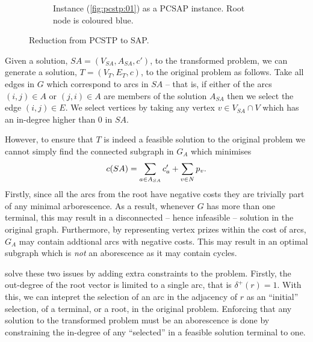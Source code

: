 \begin{figure}[h]
\begin{subfigure}[t]{0.47\linewidth}
    \caption{Instance (\ref{fig:pcstp:01}) as a PCSAP instance. Root node is coloured blue.}
  \end{subfigure}
  \caption{Reduction from PCSTP to SAP.}
  \label{fig:pcstptosap}
\end{figure}

Given a solution, $SA = (V_{SA}, A_{SA}, c')$,
to the transformed problem, we can generate a solution, $T = (V_T, E_T, c)$, to the
original problem as follows.
Take all edges in $G$ which correspond to arcs in $SA$ -- that is, if either of the arcs
$(i, j) \in A$ or $(j, i) \in A$ are members of the solution $A_{SA}$ then we select the edge $(i,j) \in E$.
We select vertices by taking any vertex $v \in V_{SA} \cap V$ which has an in-degree higher than 0 in
$SA$.

However, to ensure that $T$ is indeed a feasible solution to the original problem we
cannot simply find the connected subgraph in $G_A$ which minimises
$$c(SA) = \sum_{a \in A_{SA}} c'_{a} + \sum_{v \in N} p_v\mathnormal{.}$$
Firstly, since all the arcs from the root have negative costs they are trivially part of any minimal arborescence.
As a result, whenever $G$ has more than one terminal, this may result in a disconnected -- hence infeasible --
solution in the original graph.
Furthermore, by representing vertex prizes within the cost of arcs,
 $G_A$  may contain addtional arcs with negative costs. This may result in an
optimal subgraph which is \textit{not} an aborescence as it may contain cycles.

\citet{ljubic2005solving} solve these two issues by adding extra constraints to the problem. Firstly, the
out-degree of the root vector is limited to a single arc, that is $\delta^+(r) = 1$. With this,
we can intepret the selection of an arc in the adjacency of $r$ as an ``initial'' selection,
 of a terminal, or a root,
in the original problem. Enforcing that any solution to the transformed problem must be an aborescence
 is done by constraining the in-degree of any ``selected'' in a feasible solution terminal to one.

